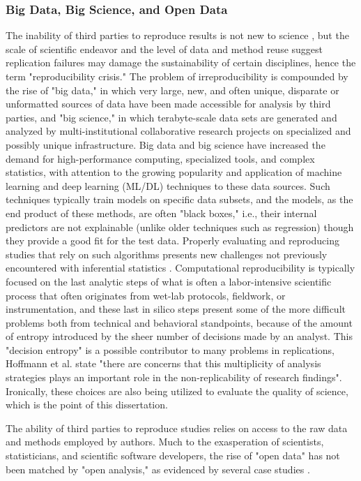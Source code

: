 \documentclass{drexelthesis}
\begin{document}
\subsubsection{Big Data, Big Science, and Open Data}

The inability of third parties to reproduce results is not new to science \cite{Lehrer2010-pm}, but the scale of scientific endeavor and the level of data and method reuse suggest replication failures may damage the sustainability of certain disciplines, hence the term "reproducibility crisis." The problem of irreproducibility is compounded by the rise of "big data," in which very large, new, and often unique, disparate or unformatted sources of data have been made accessible for analysis by third parties, and "big science," in which terabyte-scale data sets are generated and analyzed by multi-institutional collaborative research projects on specialized and possibly unique infrastructure. Big data and big science have increased the demand for high-performance computing, specialized tools, and complex statistics, with attention to the growing popularity and application of machine learning and deep learning (ML/DL) techniques to these data sources. Such techniques typically train models on specific data subsets, and the models, as the end product of these methods, are often "black boxes," i.e., their internal predictors are not explainable (unlike older techniques such as regression) though they provide a good fit for the test data. Properly evaluating and reproducing studies that rely on such algorithms presents new challenges not previously encountered with inferential statistics \cite{Warden2018-ak,Bouthillier2019-yq}. Computational reproducibility is typically focused on the last analytic steps of what is often a labor-intensive scientific process that often originates from wet-lab protocols, fieldwork, or instrumentation, and these last in silico steps present some of the more difficult problems both from technical and behavioral standpoints, because of the amount of entropy introduced by the sheer number of decisions made by an analyst. This "decision entropy" is a possible contributor to many problems in replications, Hoffmann et al. state "there are concerns that this multiplicity of analysis strategies plays an important role in the non-replicability of research findings"\cite{Hoffmann2020-sb}. Ironically, these choices are also being utilized to evaluate the quality of science, which is the point of this dissertation.

The ability of third parties to reproduce studies relies on access to the raw data and methods employed by authors. Much to the exasperation of scientists, statisticians, and scientific software developers, the rise of "open data" has not been matched by "open analysis," as evidenced by several case studies \cite{Obels2019-sy,Rauh_undated-ej,Stodden2018-ls,Stagge2019-fv}.
\end{document}
